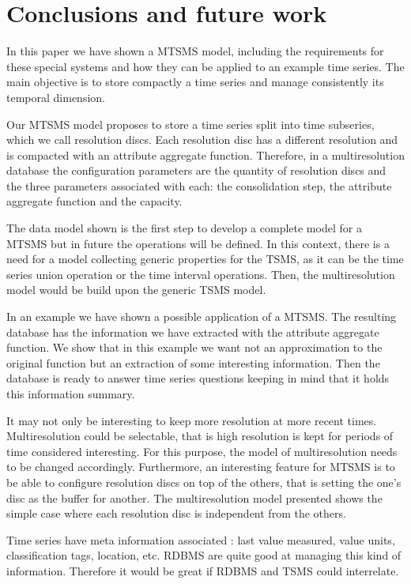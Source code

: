 \section{Conclusions and future work} 
\label{sec:concl-future-work}

In this paper we have shown a MTSMS model, including the requirements
for these special systems and how they can be applied to an example
time series. The main objective is to store compactly a time series
and manage consistently its temporal dimension.

Our MTSMS model proposes to store a time series split into time
subseries, which we call resolution discs.  Each resolution disc has a
different resolution and is compacted with an attribute aggregate
function. Therefore, in a multiresolution database the configuration
parameters are the quantity of resolution discs and the three
parameters associated with each: the consolidation step, the attribute
aggregate function and the capacity.

The data model shown is the first step to develop a complete model for
a MTSMS but in future the operations will be defined. In this context,
there is a need for a model collecting generic properties for the
TSMS, as it can be the time series union operation or the time
interval operations. Then, the multiresolution model would be build
upon the generic TSMS model.

In an example we have shown a possible application of a MTSMS. The
resulting database has the information we have extracted with the
attribute aggregate function. We show that in this example we want
not an approximation to the original function but an extraction of
some interesting information. Then the database is ready to answer
time series questions keeping in mind that it holds this information
summary.

It may not only be interesting to keep more resolution at more recent
times. Multiresolution could be selectable, that is high resolution is
kept for periods of time considered interesting. For this purpose, the
model of multiresolution needs to be changed accordingly. Furthermore,
an interesting feature for MTSMS is to be able to configure resolution
discs on top of the others, that is setting the one's disc as the
buffer for another. The multiresolution model presented shows the
simple case where each resolution disc is independent from the others.

Time series have meta information associated \cite{dreyer94}: last
value measured, value units, classification tags, location, etc. RDBMS
are quite good at managing this kind of information. Therefore it
would be great if RDBMS and TSMS could interrelate.

